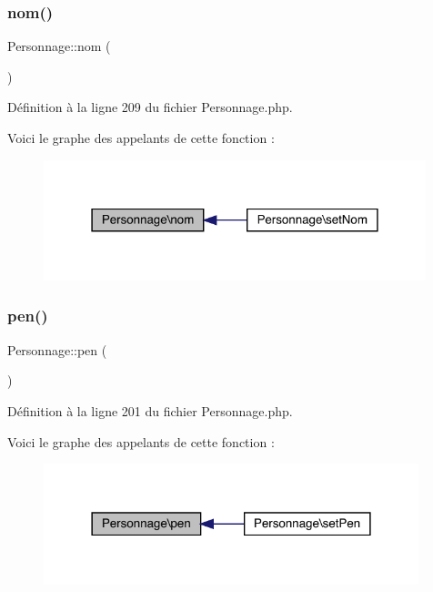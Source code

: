 \subsubsection{\texorpdfstring{nom()}{nom()}}
{\footnotesize\ttfamily Personnage\+::nom (\begin{DoxyParamCaption}{ }\end{DoxyParamCaption})}



Définition à la ligne 209 du fichier Personnage.\+php.

Voici le graphe des appelants de cette fonction \+:\nopagebreak
\begin{figure}[H]
\begin{center}
\leavevmode
\includegraphics[width=315pt]{class_personnage_a236eb0f89c6676425ddfcc25967a527a_icgraph}
\end{center}
\end{figure}
\mbox{\label{class_personnage_a4c3db78c974d2b3d0345a677e1370162}} 
\subsubsection{\texorpdfstring{pen()}{pen()}}
{\footnotesize\ttfamily Personnage\+::pen (\begin{DoxyParamCaption}{ }\end{DoxyParamCaption})}



Définition à la ligne 201 du fichier Personnage.\+php.

Voici le graphe des appelants de cette fonction \+:\nopagebreak
\begin{figure}[H]
\begin{center}
\leavevmode
\includegraphics[width=309pt]{class_personnage_a4c3db78c974d2b3d0345a677e1370162_icgraph}
\end{center}
\end{figure}
\mbox{\label{class_personnage_ae7675cda70f8e9488d1b4e28550a0871}} 
